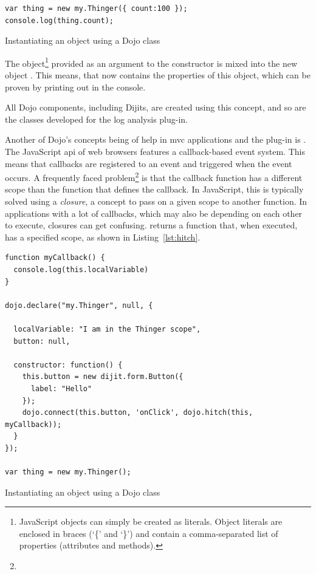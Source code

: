 \begin{listing}[H]
\begin{verbatim}
var thing = new my.Thinger({ count:100 });
console.log(thing.count);
\end{verbatim}
\caption{Instantiating an object using a Dojo class}
\label{lst:mixin}
\end{listing}

The object\footnote{JavaScript objects can simply be created as literals. Object literals are enclosed in braces (`\{' and `\}') and contain a comma-separated list of properties (attributes and methods).} provided as an argument to the  constructor is mixed into the new object . This means, that  now contains the properties of this object, which can be proven by printing out  in the console.

All Dojo components, including Dijits, are created using this concept, and so are the classes developed for the log analysis plug-in.

Another of Dojo's concepts being of help in \ac{mvc} applications and the plug-in is . The JavaScript \ac{api} of web browsers features a callback-based event system. This means that callbacks are registered to an event and triggered when the event occurs. A frequently faced problem\footnote{} is that the callback function has a different scope than the function that defines the callback. In JavaScript, this is typically solved using a \emph{closure}, a concept to pass on a given scope to another function. In applications with a lot of callbacks, which may also be depending on each other to execute, closures can get confusing.  returns a function that, when executed, has a specified scope, as shown in Listing~\ref{lst:hitch}.

\begin{listing}[H]
\begin{verbatim}
function myCallback() {
  console.log(this.localVariable)
}

dojo.declare("my.Thinger", null, {

  localVariable: "I am in the Thinger scope",
  button: null,

  constructor: function() {
    this.button = new dijit.form.Button({
      label: "Hello"
    });
    dojo.connect(this.button, 'onClick', dojo.hitch(this, myCallback));
  }
});

var thing = new my.Thinger();
\end{verbatim}
\caption{Instantiating an object using a Dojo class}
\label{lst:hitch}
\end{listing}

